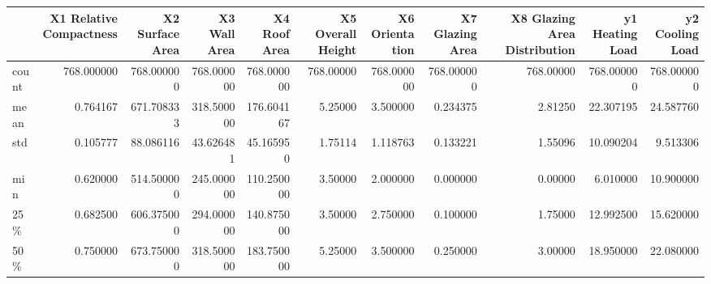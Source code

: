 \documentclass[preview]{standalone}
\begin{document}
    \begin{tabular}{lrrrrrrrrrr}
\toprule
{} &   X1 Relative Compactness       &   X2 Surface Area               &   X3 Wall Area                  &   X4 Roof Area                  &   X5 Overall Height             &   X6 Orientation                &   X7 Glazing Area               &   X8 Glazing Area Distribution  &   y1 Heating Load               &   y2 Cooling Load               \\
\midrule
count &                      768.000000 &                      768.000000 &                      768.000000 &                      768.000000 &                       768.00000 &                      768.000000 &                      768.000000 &                       768.00000 &                      768.000000 &                      768.000000 \\
mean  &                        0.764167 &                      671.708333 &                      318.500000 &                      176.604167 &                         5.25000 &                        3.500000 &                        0.234375 &                         2.81250 &                       22.307195 &                       24.587760 \\
std   &                        0.105777 &                       88.086116 &                       43.626481 &                       45.165950 &                         1.75114 &                        1.118763 &                        0.133221 &                         1.55096 &                       10.090204 &                        9.513306 \\
min   &                        0.620000 &                      514.500000 &                      245.000000 &                      110.250000 &                         3.50000 &                        2.000000 &                        0.000000 &                         0.00000 &                        6.010000 &                       10.900000 \\
25\%   &                        0.682500 &                      606.375000 &                      294.000000 &                      140.875000 &                         3.50000 &                        2.750000 &                        0.100000 &                         1.75000 &                       12.992500 &                       15.620000 \\
50\%   &                        0.750000 &                      673.750000 &                      318.500000 &                      183.750000 &                         5.25000 &                        3.500000 &                        0.250000 &                         3.00000 &                       18.950000 &                       22.080000 \\

\end{tabular}
\end{document}
